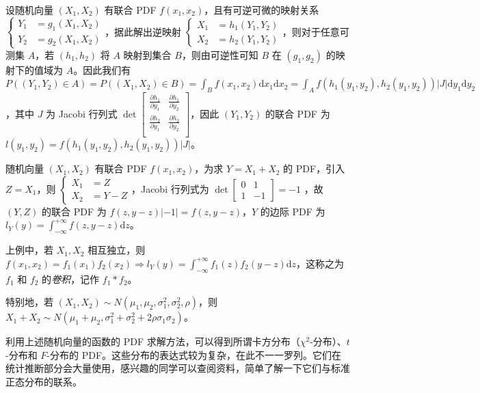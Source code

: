\documentclass[../main.tex]{subfiles}
\begin{document}
设随机向量 $(X_1,X_2)$ 有联合 PDF $f(x_1,x_2)$，且有可逆可微的映射关系 $
\left\{\begin{aligned}
Y_1&=g_1(X_1,X_2)\\
Y_2&=g_2(X_1,X_2)
\end{aligned}\right.
$，据此解出逆映射 $
\left\{\begin{aligned}
X_1&=h_1(Y_1,Y_2)\\
X_2&=h_2(Y_1,Y_2)
\end{aligned}\right.
$，则对于任意可测集 $A$，若 $(h_1,h_2)$ 将 $A$ 映射到集合 $B$，则由可逆性可知 $B$ 在 $(g_1,g_2)$ 的映射下的值域为 $A$。因此我们有 $P((Y_1,Y_2)\in A)=P((X_1,X_2)\in B)=\int_Bf(x_1,x_2)\mathrm dx_1\mathrm dx_2=\int_Af(h_1(y_1,y_2),h_2(y_1,y_2))|J|\mathrm dy_1\mathrm dy_2$，其中 $J$ 为 Jacobi 行列式 $
\det \left[\begin{matrix}
    \frac{\partial h_1}{\partial y_1} & \frac{\partial h_1}{\partial y_2}\\
    \frac{\partial h_2}{\partial y_1} & \frac{\partial h_2}{\partial y_2}\\
\end{matrix}\right]
$，因此 $(Y_1,Y_2)$ 的联合 PDF 为 $l(y_1,y_2)=f(h_1(y_1,y_2),h_2(y_1,y_2))|J|$。

\begin{example}
随机向量 $(X_1,X_2)$ 有联合 PDF $f(x_1,x_2)$，为求 $Y=X_1+X_2$ 的 PDF，引入 $Z=X_1$，则 $
\left\{\begin{aligned}
X_1&=Z\\
X_2&=Y-Z
\end{aligned}\right.
$，Jacobi 行列式为 $
\det \left[\begin{matrix}
0&1\\
1&-1
\end{matrix}\right]=-1
$
，故 $(Y,Z)$ 的联合 PDF 为 $f(z,y-z)|-1|=f(z,y-z)$，$Y$ 的边际 PDF 为 $l_Y(y)=\int_{-\infty}^{+\infty}f(z,y-z)\mathrm dz$。
\end{example}

上例中，若 $X_1,X_2$ 相互独立，则 $f(x_1,x_2)=f_1(x_1)f_2(x_2)\Rightarrow l_Y(y)=\int_{-\infty}^{+\infty}f_1(z)f_2(y-z)\mathrm dz$，这称之为 $f_1$ 和 $f_2$ 的\emph{卷积}，记作 $f_1\ast f_2$。

特别地，若 $(X_1,X_2)\sim N(\mu_1,\mu_2,\sigma_1^2,\sigma_2^2,\rho)$，则 $X_1+X_2\sim N(\mu_1+\mu_2,\sigma_1^2+\sigma_2^2+2\rho\sigma_1\sigma_2)$。

利用上述随机向量的函数的 PDF 求解方法，可以得到所谓卡方分布（$\chi^2$-分布）、$t$-分布和 $F$-分布的 PDF。这些分布的表达式较为复杂，在此不一一罗列。它们在统计推断部分会大量使用，感兴趣的同学可以查阅资料，简单了解一下它们与标准正态分布的联系。
\end{document}
